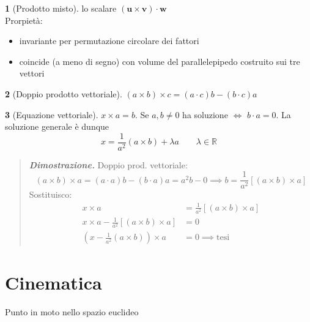 \documentclass[a4paper,10pt]{article}
\theoremstyle{definition}
\newcommand{\bv}{\boldsymbol} %
\newcommand{\re}{\mathbb{R}} %
\theoremstyle{indentdefinition}
\theoremstyle{indenttheorem}
\theoremstyle{myremark}
\theoremstyle{indentgeneral}
\newtheorem*{gen}{}
\newenvironment{dimo}{\begin{quote}\textit{\textbf{Dimostrazione.}}}{\end{quote}} %
\begin{document}
\begin{gen}[Prodotto misto]
lo scalare $(\bv{u}\times \bv{v})\cdot\bv{w}$ \\
Prorpietà:
\begin{itemize}[leftmargin=15mm]
\item invariante per permutazione circolare dei fattori
\item coincide (a meno di segno) con volume del parallelepipedo costruito sui tre vettori
\end{itemize}
\end{gen}

\begin{gen}[Doppio prodotto vettoriale]
$\left(a\times b\right)\times c=\left(a\cdot c\right)b-\left(b\cdot c\right)a$
\end{gen}

\begin{gen}[Equazione vettoriale]
$x\times a=b$. Se $a,b\neq0$ ha
soluzione $\iff$ $b\cdot a=0$. La soluzione generale è dunque
\[
x=\frac{1}{a^{2}}\left(a\times b\right)+\lambda a \qquad\lambda\in\re
\]
\end{gen}
\begin{dimo}
    Doppio prod. vettoriale: $$(a\times b)\times a=(a\cdot a)b - (b\cdot a)a=a^2b-0 \implies b= \frac{1}{a^2}[(a\times b)\times a] $$
    Sostituisco:
    \begin{align*}
    x\times a &= \frac{1}{a^2}[(a\times b)\times a] \\
    x\times a - \frac{1}{a^2}[(a\times b)\times a] &= 0 \\
     (x - \frac{1}{a^2}(a\times b))\times a &= 0 \implies \text{tesi}
     \end{align*}
    
\end{dimo}


\section{Cinematica}
Punto in moto nello spazio euclideo
\end{document}
